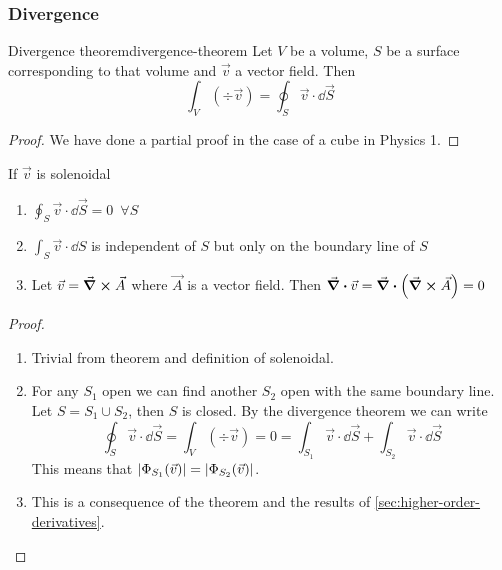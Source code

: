 \documentclass[12pt]{extarticle}
\begin{document}
\subsubsection{Divergence}

\begin{theorem}{Divergence theorem}{divergence-theorem}
	Let $V$ be a volume, $S$ be a surface corresponding to that volume and $\vec v$ a vector field.
	Then
	\begin{equation}
		\int_V \left(\div \vec v\right) = \oint_S \vec v \cdot \dd{\vec S}
	\end{equation}
\end{theorem}

\begin{proof}
	We have done a partial proof in the case of a cube in Physics 1.
\end{proof}

\begin{corollary}{}{}
	If $\vec v$ is solenoidal
	\begin{enumerate}
		\item $\oint_S \vec v \cdot \dd{\vec S} = 0 \enspace \forall S$
		\item $\int_S \vec v \cdot \dd{S}$ is independent of $S$ but only on the boundary line of $S$
		\item Let $\vec v = \curl \vec A$ where $\vec A$ is a vector field. Then $\div \vec v = \div (\curl \vec A) = 0$
	\end{enumerate}
\end{corollary}

\begin{proof}
	\skiplineafterproof
	\begin{enumerate}
		\item Trivial from theorem and definition of solenoidal.
		\item
		      For any $S_1$ open we can find another $S_2$ open with the same boundary line.
		      Let $S = S_1 \cup S_2$, then $S$ is closed.
		      By the divergence theorem we can write
		      \begin{equation}
			      \oint_S \vec v \cdot \dd{\vec S} = \int_V \left(\div \vec v\right) = 0 = \int_{S_1} \vec v \cdot \dd{\vec S} + \int_{S_2} \vec v \cdot \dd{\vec S}
		      \end{equation}
		      This means that $\abs{\Phi_{S_1}(\vec v)} = \abs{\Phi_{S_2} (\vec v)}$.
		\item This is a consequence of the theorem and the results of \cref{sec:higher-order-derivatives}.
	\end{enumerate}
\end{proof}
\end{document}
